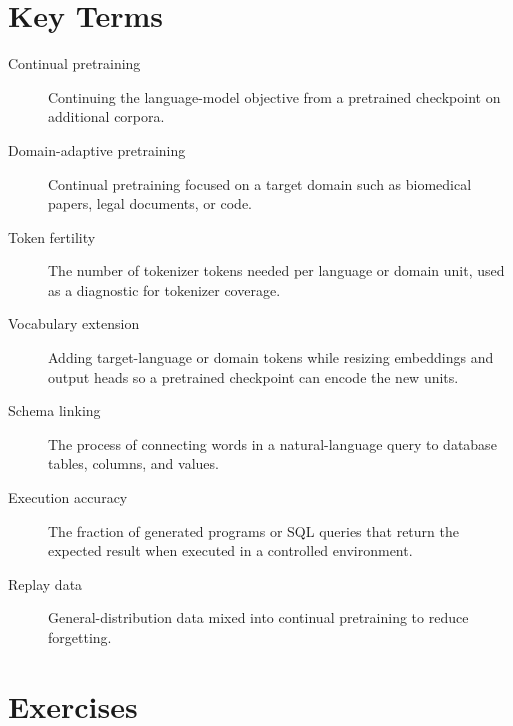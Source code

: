 \section{Key Terms}
\label{sec:domain-key-terms}

\begin{description}
\item[Continual pretraining] Continuing the language-model objective from a pretrained checkpoint on additional corpora.
\item[Domain-adaptive pretraining] Continual pretraining focused on a target domain such as biomedical papers, legal documents, or code.
\item[Token fertility] The number of tokenizer tokens needed per language or domain unit, used as a diagnostic for tokenizer coverage.
\item[Vocabulary extension] Adding target-language or domain tokens while resizing embeddings and output heads so a pretrained checkpoint can encode the new units.
\item[Schema linking] The process of connecting words in a natural-language query to database tables, columns, and values.
\item[Execution accuracy] The fraction of generated programs or SQL queries that return the expected result when executed in a controlled environment.
\item[Replay data] General-distribution data mixed into continual pretraining to reduce forgetting.
\end{description}

\section{Exercises}
\label{sec:domain-exercises}

